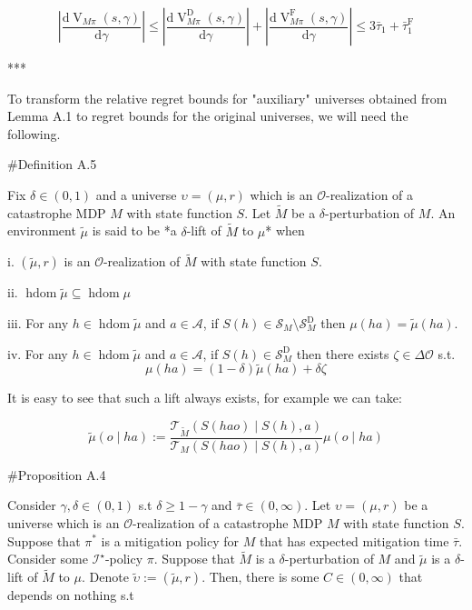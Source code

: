 \documentclass[a4paper]{article}
\newcommand{\Comment}[1]{}
\newcommand{\AP}[1]{\left(#1\right)}
\newcommand{\AB}[1]{\left[#1\right]}
\newcommand{\Ea}[2]{\underset{#1}{\operatorname{E}}\AB{#2}}
\newcommand{\D}{\mathrm{d}}
\newcommand{\Abs}[1]{\left\vert #1 \right\vert}
\newcommand{\Ob}{\mathcal{O}}
\newcommand{\A}{\mathcal{A}}
\newcommand{\St}{\mathcal{S}}
\newcommand{\T}{\mathcal{T}}
\newcommand{\In}{\mathcal{I}}
\DeclareMathOperator{\HD}{hdom}
\newcommand{\RMD}{\mathrm{D}}
\newcommand{\RMF}{\mathrm{F}}
\newcommand{\SD}{\St^{\RMD}}
\newcommand{\V}{\operatorname{V}}
\begin{document}
$$\Abs{\frac{\D\V_{M\pi}(s,\gamma)}{\D\gamma}} \leq \Abs{\frac{\D\V_{M\pi}^\RMD(s,\gamma)}{\D\gamma}}+\Abs{\frac{\D\V_{M\pi}^\RMF(s,\gamma)}{\D\gamma}} \leq 3 \bar{\tau}_1 + \bar{\tau}_1^\RMF$$

\Comment{$$\Abs{\frac{\D\V_{M\pi}^\RMF(s,\gamma)}{\D\gamma}\bigg\vert_{\gamma=1}} \leq \bar{\tau}_1 + \Ea{x\sim\mu_{M\pi s}}{\Abs{\V_{M\pi}^1\AP{x_{\tau(x)}}}} \leq \bar{\tau}_1 + \bar{\tau}_1^\RMF$$

We conclude

$$\Abs{\V_{M\pi}^1(s)} \leq \Abs{\frac{\D\V_{M\pi}^\RMD(s,\gamma)}{\D\gamma}\bigg\vert_{\gamma=1}}+\Abs{\frac{\D\V_{M\pi}^\RMF(s,\gamma)}{\D\gamma}\bigg\vert_{\gamma=1}} \leq 3 \bar{\tau}_1 + \bar{\tau}_1^\RMF$$}

***

To transform the relative regret bounds for "auxiliary" universes obtained from Lemma A.1 to regret bounds for the original universes, we will need the following.

\#Definition A.5

Fix $\delta\in(0,1)$ and a universe $\upsilon=(\mu,r)$ which is an $\Ob$-realization of a catastrophe MDP $M$ with state function $S$. Let $\tilde{M}$ be a $\delta$-perturbation of $M$. An environment $\tilde{\mu}$ is said to be *a $\delta$-lift of $\tilde{M}$ to $\mu$* when

i. $(\tilde{\mu},r)$ is an $\Ob$-realization of $\tilde{M}$ with state function $S$.

ii. $\HD{\tilde{\mu}} \subseteq \HD{\mu}$

iii. For any $h \in \HD{\tilde{\mu}}$ and $a\in\A$, if $S(h) \in \St_M \setminus \SD_M$ then $\mu(ha) = \tilde{\mu}(ha)$.

iv. For any $h \in \HD{\tilde{\mu}}$ and $a\in\A$, if $S(h)\in\SD_M$ then there exists $\zeta\in\Delta\Ob$ s.t. $$\mu(ha) = (1-\delta)\tilde{\mu}(ha) + \delta\zeta$$

It is easy to see that such a lift always exists, for example we can take:

$$\tilde{\mu}(o \mid ha) := \frac{\T_{\tilde{M}}\AP{S(hao) \mid S(h),a}}{\T_{M}\AP{S(hao) \mid S(h),a}}\mu(o \mid ha)$$

\#Proposition A.4

Consider $\gamma,\delta\in(0,1)$ s.t $\delta \geq 1 - \gamma$ and $\bar{\tau}\in(0,\infty)$. Let $\upsilon=(\mu,r)$ be a universe which is an $\Ob$-realization of a catastrophe MDP $M$ with state function $S$. Suppose that $\pi^*$ is a mitigation policy for $M$ that has expected mitigation time $\bar{\tau}$. Consider some $\In^\star$-policy $\pi$. Suppose that $\tilde{M}$ is a $\delta$-perturbation of $M$ and $\tilde{\mu}$ is a $\delta$-lift of $\tilde{M}$ to $\mu$. Denote $\tilde{\upsilon}:=(\tilde{\mu},r)$. Then, there is some $C\in(0,\infty)$ that depends on nothing s.t
\end{document}

